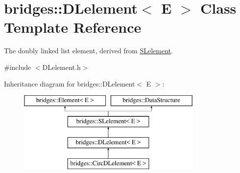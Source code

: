 \hypertarget{classbridges_1_1_d_lelement}{}\section{bridges\+:\+:D\+Lelement$<$ E $>$ Class Template Reference}
\label{classbridges_1_1_d_lelement}


The doubly linked list element, derived from \hyperlink{classbridges_1_1_s_lelement}{S\+Lelement}.  




{\ttfamily \#include $<$D\+Lelement.\+h$>$}

Inheritance diagram for bridges\+:\+:D\+Lelement$<$ E $>$\+:\begin{figure}[H]
\begin{center}
\leavevmode
\includegraphics[height=4.000000cm]{classbridges_1_1_d_lelement}
\end{center}
\end{figure}
